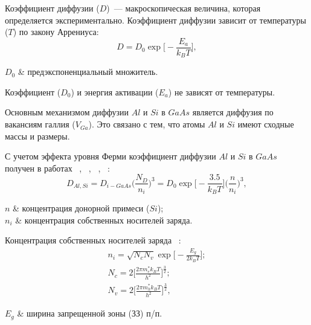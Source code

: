 
Коэффициент диффузии ($D$)~--- макроскопическая величина, которая определяется экспериментально. Коэффициент диффузии зависит от температуры ($T$) по закону Аррениуса:
\begin{equation}
	\label{eq:DConst}
	D = D_{0}\exp\bigg[-\frac{E_{a}}{k_{B}T}\bigg],
\end{equation}
\begin{conditions}
	$D_{0}$ & предэкспоненциальный множитель.
\end{conditions}
Коэффициент ($D_{0}$) и энергия активации ($E_{a}$) не зависят от температуры.

Основным механизмом диффузии $Al$ и $Si$ в $GaAs$ является диффузия по вакансиям галлия ($V_{Ga}$). Это связано с тем, что атомы $Al$ и $Si$ имеют сходные массы и размеры. 

С учетом эффекта уровня Ферми коэффициент диффузии $Al$ и $Si$ в $GaAs$ получен в работах ~\cite{getMeshkov}, ~\cite{Meshkov}, ~\cite{Meshkov}, ~\cite{Makeev}:
\begin{equation}
	\label{eq:DNd}
	D_{Al,Si} = D_{i-GaAs}\Big( \frac{N_{D}}{n_{i}} \Big)^{3} = D_{0}\exp\bigg[-\frac{3.5}{k_{B}T}\bigg]\Big( \frac{n}{n_{i}} \Big)^{3},
\end{equation}
\begin{conditions}
	$n$ & концентрация донорной примеси ($Si$);\\
	$n_{i}$ & концентрация собственных носителей заряда.
\end{conditions}

Концентрация собственных носителей заряда ~\cite{MFTIne}:
\begin{gather}
	n_{i} = \sqrt{N_{c}N_{v}}\exp\!\bigg[ - \frac{E_{g}}{2k_{B}T} \bigg];\\
	N_{c} = 2\Big[ \frac{2\pi m_{e}^{\ast}k_{B}T}{h^{2}} \Big]^{\frac{3}{2}};\\
	N_{v} = 2\Big[ \frac{2\pi m_{h}^{\ast}k_{B}T}{h^{2}} \Big]^{\frac{3}{2}},
\end{gather}
\begin{conditions}
	$E_{g}$ & ширина запрещенной зоны (ЗЗ) п/п.
\end{conditions}



